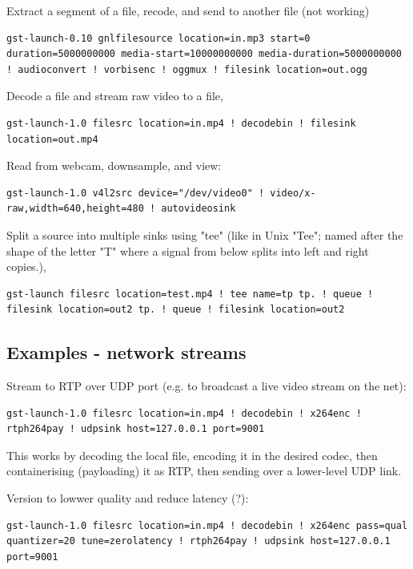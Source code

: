 \documentclass[oneside,english]{scrbook}
\begin{document}
Extract a segment of a file, recode, and send to another file (not
working) 

\begin{lstlisting}
gst-launch-0.10 gnlfilesource location=in.mp3 start=0
duration=5000000000 media-start=10000000000 media-duration=5000000000
! audioconvert ! vorbisenc ! oggmux ! filesink location=out.ogg
\end{lstlisting}

Decode a file and stream raw video to a file, 
\begin{lstlisting}
gst-launch-1.0 filesrc location=in.mp4 ! decodebin ! filesink location=out.mp4
\end{lstlisting}

Read from webcam, downsample, and view:
\begin{lstlisting}
gst-launch-1.0 v4l2src device="/dev/video0" ! video/x-raw,width=640,height=480 ! autovideosink
\end{lstlisting}

Split a source into multiple sinks using "tee" (like in Unix "Tee"; named after the shape of the letter "T" where a signal from below splits into left and right copies.),

\begin{lstlisting}
gst-launch filesrc location=test.mp4 ! tee name=tp tp. ! queue ! filesink location=out2 tp. ! queue ! filesink location=out2
\end{lstlisting}

\subsection{Examples - network streams}

Stream to RTP over UDP port (e.g. to broadcast a live video stream on the net):
\begin{lstlisting}
gst-launch-1.0 filesrc location=in.mp4 ! decodebin ! x264enc ! rtph264pay ! udpsink host=127.0.0.1 port=9001
\end{lstlisting}
This works by decoding the local file, encoding it in the desired codec, then containerising (payloading) it as RTP, then sending over a lower-level UDP link.

Version to lowwer quality and reduce latency (?):
\begin{lstlisting}
gst-launch-1.0 filesrc location=in.mp4 ! decodebin ! x264enc pass=qual quantizer=20 tune=zerolatency ! rtph264pay ! udpsink host=127.0.0.1 port=9001
\end{lstlisting}
\end{document}
